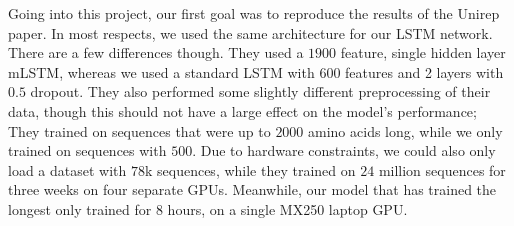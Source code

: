 Going into this project, our first goal was to reproduce the results of the Unirep paper\cite{unirep}. In most respects, we used the same architecture for our LSTM network. There are a few differences though. They used a $1900$ feature, single hidden layer mLSTM, whereas we used a standard LSTM with $600$ features and 2 layers with $0.5$ dropout. They also performed some slightly different preprocessing of their data, though this should not have a large effect on the model's performance; They trained on sequences that were up to $2000$ amino acids long, while we only trained on sequences with $500$. Due to hardware constraints, we could also only load a dataset with $78$k sequences, while they trained on $24$ million sequences for three weeks on four separate GPUs. Meanwhile, our model that has trained the longest only trained for $8$ hours, on a single MX250 laptop GPU.